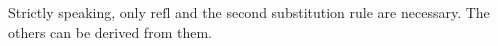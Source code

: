 \documentclass[letterpaper,10pt,english]{sphinxmanual}
\begin{document}
\begin{center}
\AXM{}
\DP
\quad
{}
\DP
\quad
{}
\DP
\\
\ \\
\DP
\quad
{}
\DP
\end{center}

\sphinxAtStartPar
Strictly speaking, only \(\mathrm{refl}\) and the second substitution rule are necessary. The others can be derived from them.



\renewcommand{\indexname}{Index}
\printindex
\end{document}
